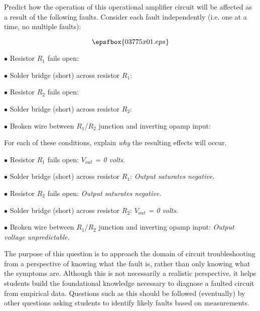 

Predict how the operation of this operational amplifier circuit will be affected as a result of the following faults.  Consider each fault independently (i.e. one at a time, no multiple faults):

$$\epsfbox{03775x01.eps}$$

\medskip
\item{$\bullet$} Resistor $R_1$ fails open:
\vskip 5pt
\item{$\bullet$} Solder bridge (short) across resistor $R_1$:
\vskip 5pt
\item{$\bullet$} Resistor $R_2$ fails open:
\vskip 5pt
\item{$\bullet$} Solder bridge (short) across resistor $R_2$:
\vskip 5pt
\item{$\bullet$} Broken wire between $R_1$/$R_2$ junction and inverting opamp input:
\medskip

For each of these conditions, explain {\it why} the resulting effects will occur.







\medskip
\item{$\bullet$} Resistor $R_1$ fails open: {\it $V_{out}$ = 0 volts.}
\vskip 5pt
\item{$\bullet$} Solder bridge (short) across resistor $R_1$: {\it Output saturates negative.}
\vskip 5pt
\item{$\bullet$} Resistor $R_2$ fails open: {\it Output saturates negative.}
\vskip 5pt
\item{$\bullet$} Solder bridge (short) across resistor $R_2$: {\it $V_{out}$ = 0 volts.}
\vskip 5pt
\item{$\bullet$} Broken wire between $R_1$/$R_2$ junction and inverting opamp input: {\it Output voltage unpredictable.}
\medskip







The purpose of this question is to approach the domain of circuit troubleshooting from a perspective of knowing what the fault is, rather than only knowing what the symptoms are.  Although this is not necessarily a realistic perspective, it helps students build the foundational knowledge necessary to diagnose a faulted circuit from empirical data.  Questions such as this should be followed (eventually) by other questions asking students to identify likely faults based on measurements.




